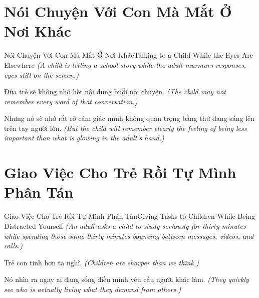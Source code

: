 \section{Nói Chuyện Với Con Mà Mắt Ở Nơi Khác}
\begin{truyen}{Nói Chuyện Với Con Mà Mắt Ở Nơi Khác}{Talking to a Child While the Eyes Are Elsewhere}
\textit{(A child is telling a school story while the adult murmurs responses, eyes still on the screen.)}

Đứa trẻ sẽ không nhớ hết nội dung buổi nói chuyện.
\textit{(The child may not remember every word of that conversation.)}

Nhưng nó sẽ nhớ rất rõ cảm giác mình không quan trọng bằng thứ đang sáng lên trên tay người lớn.
\textit{(But the child will remember clearly the feeling of being less important than what is glowing in the adult's hand.)}

\end{truyen}

\section{Giao Việc Cho Trẻ Rồi Tự Mình Phân Tán}
\begin{truyen}{Giao Việc Cho Trẻ Rồi Tự Mình Phân Tán}{Giving Tasks to Children While Being Distracted Yourself}
\textit{(An adult asks a child to study seriously for thirty minutes while spending those same thirty minutes bouncing between messages, videos, and calls.)}

Trẻ con tinh hơn ta nghĩ.
\textit{(Children are sharper than we think.)}

Nó nhìn ra ngay ai đang sống điều mình yêu cầu người khác làm.
\textit{(They quickly see who is actually living what they demand from others.)}

\end{truyen}

